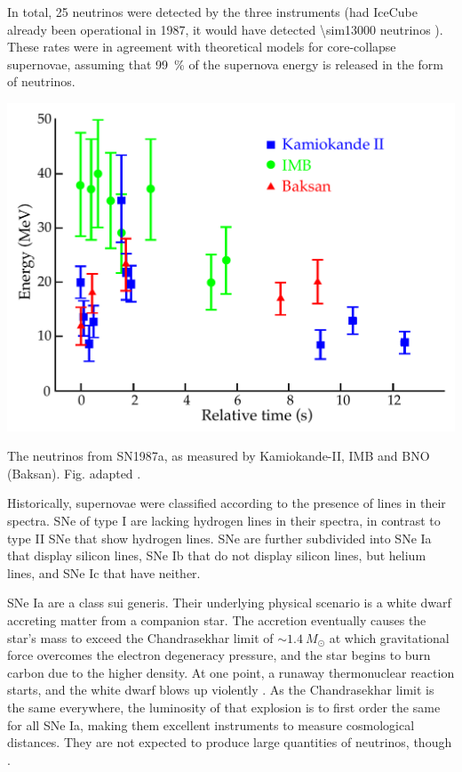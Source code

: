 \documentclass[
    a4paper, %
    fontsize=10pt, %
    twoside=false, %
    numbers=noenddot, %
    fontmethod=tex,
]{kaobook}
\begin{document}
In total, 25 neutrinos were detected by the three instruments (had IceCube already been operational in 1987, it would have detected \num{\sim13000} neutrinos ). These rates were in agreement with theoretical models for core-collapse supernovae, assuming that \SI{99}{\percent} of the supernova energy is released in the form of neutrinos.

\begin{marginfigure}
    \includegraphics{theory/sn1987a_flux.pdf}
    \caption[Neutrinos from SN1987a]{The neutrinos from SN1987a, as measured by Kamiokande-II, IMB and BNO (Baksan). Fig. adapted \cite{Grupen2005}.}
\end{marginfigure}

Historically, supernovae were classified according to the presence of lines in their spectra. SNe of type I are lacking hydrogen lines in their spectra, in contrast to type II SNe that show hydrogen lines. SNe are further subdivided into SNe Ia that display silicon lines, SNe Ib that do not display silicon lines, but helium lines, and SNe Ic that have neither.

SNe Ia are a class sui generis. Their underlying physical scenario is a white dwarf accreting matter from a companion star. The accretion eventually causes the star's mass to exceed the Chandrasekhar limit of $\sim 1.4~M_\odot$ at which gravitational force overcomes the electron degeneracy pressure, and the star begins to burn carbon due to the higher density. At one point, a runaway thermonuclear reaction starts, and the white dwarf blows up violently . As the Chandrasekhar limit is the same everywhere, the luminosity of that explosion is to first order the same for all SNe Ia, making them excellent instruments to measure cosmological distances. They are not expected to produce large quantities of neutrinos, though .
\end{document}
